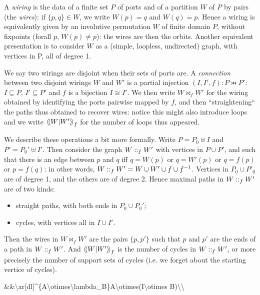 A \emph{wiring} is the data of a finite set \(P\) of ports and of a
partition \({W}\) of \(P\) by pairs (the \emph{wires}): if
\(\{p,q\}\in{W}\), we write \({W}(p)=q\) and \({W}(q)=p\). Hence a
wiring is equivalently given by an involutive permutation \({W}\) of
finite domain \(P\), without fixpoints (forall \(p\), \({W}(p)\not=p\)):
the wires are then the orbits. Another equivalent presentation is to
consider \({W}\) as a (simple, loopless, undirected) graph, with
vertices in P, all of degree 1.

We say two wirings are disjoint when their sets of ports are. A
\emph{connection} between two disjoint wirings \(W\) and \(W'\) is a
partial injection \((I,I',f):P\pinj P'\): \(I\subseteq P\),
\(I'\subseteq P'\) and \(f\) is a bijection \(I\cong I'\). We then write
\(W\bowtie_f{{W}'}\) for the wiring obtained by identifying the ports
pairwise mapped by \(f\), and then ``straightening`` the paths thus
obtained to recover wires: notice this might also introduce loops and we
write \(\left\langle\!\left\langle W\middle|W'\right\rangle\!\right\rangle_f\) for the number of loops thus appeared.

We describe these operations a bit more formally. Write
\(P = P_0\uplus I\) and \(P' = P_0'\uplus I'\). Then consider the graph
\(W\mathrel{::}_f{{W}'}\) with vertices in \(P\cup P'\), and such that
there is an edge between \(p\) and \(q\) iff \(q={W}(p)\) or
\(q={W'}(p)\) or \(q=f(p)\) or \(p=f(q)\): in other words,
\(W\mathrel{::}_f{{W}'}=W\cup W'\cup f\cup f^{-1}\). Vertices in
\(P_0\cup P'_0\) are of degree 1, and the others are of degree 2. Hence
maximal paths in \(W\mathrel{::}_f{{W}'}\) are of two kinds:

\begin{itemize}
\tightlist
\item
  straight paths, with both ends in \(P_0\cup P_0'\);
\item
  cycles, with vertices all in \(I\cup I'\).
\end{itemize}

Then the wires in \(W\bowtie_f{{W}'}\) are the pairs \(\{p,p'\}\) such
that \(p\) and \(p'\) are the ends of a path in \(W\mathrel{::}_f{{W}'}\).
And \(\left\langle\!\left\langle W\middle|W'\right\rangle\!\right\rangle_{f}\) is the number of cycles in
\(W\mathrel{::}_f{{W}'}\), or more precisely the number of support sets of
cycles (i.e. we forget about the starting vertice of cycles).

\&\&\textbackslash{}ar{[}dl{]}\^{}\{A\textbackslash{}otimes\textbackslash{}lambda\_B\}A\textbackslash{}otimes(I\textbackslash{}otimes
B)\textbackslash{}\textbackslash{}

